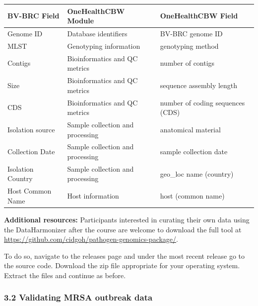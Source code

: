 \documentclass[
]{book}
\begin{document}
\begin{longtable}[]{@{}
  >{\raggedright\arraybackslash}p{}
  >{\raggedright\arraybackslash}p{}
  >{\raggedright\arraybackslash}p{}@{}}
\toprule\noalign{}
\begin{minipage}[b]{\linewidth}\raggedright
BV-BRC Field
\end{minipage} & \begin{minipage}[b]{\linewidth}\raggedright
OneHealthCBW Module
\end{minipage} & \begin{minipage}[b]{\linewidth}\raggedright
OneHealthCBW Field
\end{minipage} \\
\midrule\noalign{}
\endhead
\bottomrule\noalign{}
\endlastfoot
Genome ID & Database identifiers & BV-BRC genome ID \\
MLST & Genotyping information & genotyping method \\
Contigs & Bioinformatics and QC metrics & number of contigs \\
Size & Bioinformatics and QC metrics & sequence assembly length \\
CDS & Bioinformatics and QC metrics & number of coding sequences (CDS) \\
Isolation source & Sample collection and processing & anatomical material \\
Collection Date & Sample collection and processing & sample collection date \\
Isolation Country & Sample collection and processing & geo\_loc name (country) \\
Host Common Name & Host information & host (common name) \\
\end{longtable}

\textbf{Additional resources:} Participants interested in curating their own data using the DataHarmonizer after the course are welcome to download the full tool at \url{https://github.com/cidgoh/pathogen-genomics-package/}.

To do so, navigate to the releases page and under the most recent release go to the source code. Download the zip file appropriate for your operating system. Extract the files and continue as before.

\subsubsection{3.2 Validating MRSA outbreak data}\label{validating-mrsa-outbreak-data}
\end{document}
